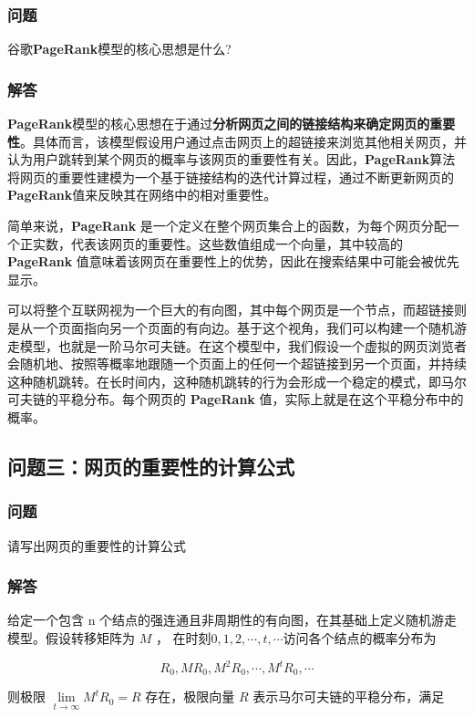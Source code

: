 \documentclass[a4,10pt,zihao=-4]{ctexart}
\begin{document}
\subsubsection{问题}
谷歌\textbf{PageRank}模型的核心思想是什么?

\subsubsection{解答}
\textbf{PageRank}模型的核心思想在于通过\textbf{分析网页之间的链接结构来确定网页的重要性}。具体而言，该模型假设用户通过点击网页上的超链接来浏览其他相关网页，并认为用户跳转到某个网页的概率与该网页的重要性有关。因此，\textbf{PageRank}算法将网页的重要性建模为一个基于链接结构的迭代计算过程，通过不断更新网页的\textbf{PageRank}值来反映其在网络中的相对重要性。

简单来说，\textbf{PageRank} 是一个定义在整个网页集合上的函数，为每个网页分配一个正实数，代表该网页的重要性。这些数值组成一个向量，其中较高的 \textbf{PageRank} 值意味着该网页在重要性上的优势，因此在搜索结果中可能会被优先显示。

可以将整个互联网视为一个巨大的有向图，其中每个网页是一个节点，而超链接则是从一个页面指向另一个页面的有向边。基于这个视角，我们可以构建一个随机游走模型，也就是一阶马尔可夫链。在这个模型中，我们假设一个虚拟的网页浏览者会随机地、按照等概率地跟随一个页面上的任何一个超链接到另一个页面，并持续这种随机跳转。在长时间内，这种随机跳转的行为会形成一个稳定的模式，即马尔可夫链的平稳分布。每个网页的 \textbf{PageRank} 值，实际上就是在这个平稳分布中的概率。

\subsection{问题三：网页的重要性的计算公式}
\subsubsection{问题}
请写出网页的重要性的计算公式

\subsubsection{解答}
给定一个包含 n 个结点的强连通且非周期性的有向图，在其基础上定义随机游走模型。假设转移矩阵为 $M$ ， 在时刻$ 0,1,2, \cdots ,t, \cdots $访问各个结点的概率分布为

$$
{R_0},M{R_0},{M^2}{R_0}, \cdots ,{M^t}{R_0}, \cdots
$$

则极限 $ \lim \limits_{t \to \infty } {M^t}{R_0} = R$ 存在，极限向量 $R$ 表示马尔可夫链的平稳分布，满足
\end{document}
